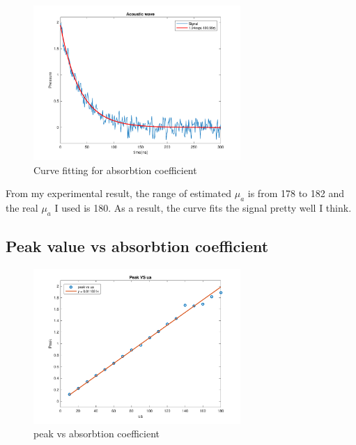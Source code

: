 \documentclass{article}
\begin{document}
\begin{figure}[H]
    \centering
    \includegraphics[width=0.7\textwidth]{src/p1c.pdf}
    \caption{Curve fitting for absorbtion coefficient}
    \label{fig:p1c}
\end{figure}

From my experimental result, the range of estimated $\mu_a$ is from 178 to 182 and the real $\mu_a$ I used is 180. 
As a result, the curve fits the signal pretty well I think.


\subsection{Peak value vs absorbtion coefficient}
\begin{figure}[H]
    \centering
    \includegraphics[width=0.7\textwidth]{src/p1d.pdf}
    \caption{peak vs absorbtion coefficient}
    \label{fig:p1d}
\end{figure}
\end{document}
